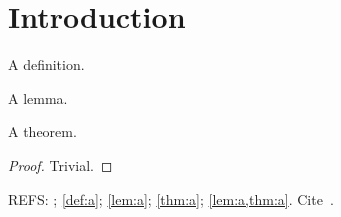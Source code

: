 ﻿\section{Introduction}\label{sec:intro}
\begin{definition}\label{def:a}A definition.\end{definition}
\begin{lemma}\label{lem:a}A lemma.\end{lemma}
\begin{theorem}\label{thm:a}A theorem.\end{theorem}
\begin{proof}Trivial.\end{proof}
\noindent REFS: ; \cref{def:a}; \cref{lem:a}; \cref{thm:a}; \cref{lem:a,thm:a}. Cite~\cite{Dummy2001}.
